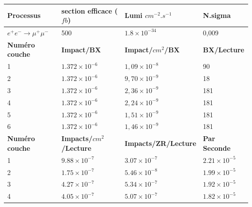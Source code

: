     \begin{table}[!hb]
    \centering
  \scriptsize  
\begin{tabular}{|l|l|l|l|}
\hline
\textbf{Processus}       & \textbf{section efficace ($fb$)} & \textbf{Lumi $cm^{-2}.s^{-1}$}               & \textbf{N.sigma}      \\ \hline
\textbf{$e^+ e^- \rightarrow \mu^+ \mu^-$} & 500                            & $1.8 \times 10^{-34}$ & 0,009                 \\ \hline
\textbf{Num\'ero couche}   & \textbf{Impact/BX}               & \textbf{Impact/$cm^2$/BX}                 & \textbf{BX/Lecture}   \\ \hline
1                        & $1.372 \times 10^{-6}$                    & $1,09 \times 10^{-8}$                 & 90                    \\ \hline
2                        & $1.372 \times 10^{-6}$                    & $9,70 \times 10^{-9}$                & 18                    \\ \hline
3                        & $1.372 \times 10^{-6}$                    & $2,36 \times 10^{-9}$                & 181                   \\ \hline
4                        & $1.372 \times 10^{-6}$                    & $2,24 \times 10^{-9}$                & 181                   \\ \hline
5                        & $1.372 \times 10^{-6}$                    & $1,51 \times 10^{-9}$                & 181                   \\ \hline
6                        & $1.372 \times 10^{-6}$                    & $1,46 \times 10^{-9}$                 & 181                   \\ \hline
\textbf{Num\'ero couche}   & \textbf{Impacts/$cm^2$/Lecture}      & \textbf{Impacts/ZR/Lecture}    & \textbf{Par Seconde}  \\ \hline
1                        & $9.88 \times 10^{-7}$          & $3.07 \times 10^{-7}$                & $2.21 \times 10^{-5}$  \\ \hline
2                        & $1.75 \times 10^{-7}$          & $5.46 \times 10^{-8}$                & $1.99 \times 10^{-5}$ \\ \hline
3                        & $4.27 \times 10^{-7}$          & $5.34 \times 10^{-7}$                & $1.92 \times 10^{-5}$ \\ \hline
4                        & $4.05 \times 10^{-7}$          & $5.07 \times 10^{-7}$                & $1.82 \times 10^{-5}$ \\ \hline

\end{tabular}
\end{table}
